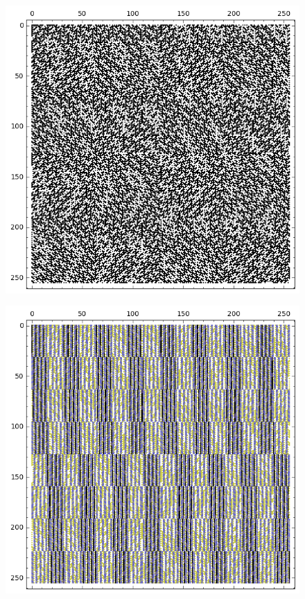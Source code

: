 \documentclass[12pt,a4paper]{article}
\begin{document}
\begin{figure}[!hb]
\centering
\begin{minipage}{.48\textwidth}
  \centering
  \includegraphics[width=.9\linewidth]{../matrix_plot/re8_3_weight_class_matrix.png}
  \label{fig:8_3_weight_class_matrix}
\end{minipage}%
\begin{minipage}{.48\textwidth}
  \centering
  \includegraphics[width=.9\linewidth]{../matrix_plot/re8_3_bent_cayley_graph_index_matrix.png}
  \label{fig:8_3_bent_cayley_graph_index_matrix}
\end{minipage}
\end{figure}
~
\end{document}
